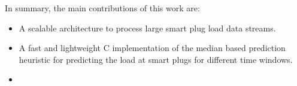 
In summary, the main contributions of this work are:

\begin{itemize}

 \item A scalable architecture to process large smart plug load data streams.
 \item A fast and lightweight C implementation of the median based prediction heuristic for predicting the load at smart plugs for different time windows.
 \item
\end{itemize}